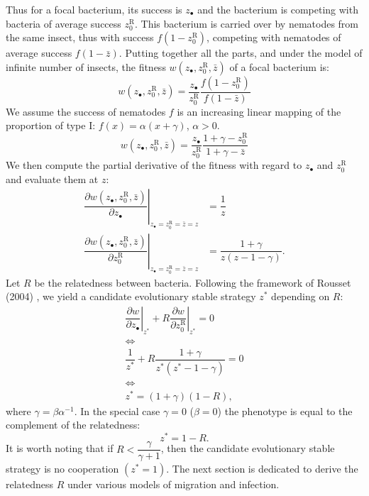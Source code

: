 \documentclass[10pt]{article}
\begin{document}
\begin{multicols}{2}
Thus for a focal bacterium, its success is $z_\bullet$ and the bacterium is competing with bacteria of average success $z_0^{\mathrm{R}}$. 
This bacterium is carried over by nematodes from the same insect, thus with success $f(1- z_0^{\mathrm{R}})$, competing with nematodes of average success $f(1- \bar{z} )$.
  Putting together all the parts, and under the model of infinite number of insects, the fitness $w(z_\bullet ,z_0^{\mathrm{R}} , \bar{z} )$ of a focal bacterium is:
  \begin{equation}
  w(z_\bullet ,z_0^{\mathrm{R}} , \bar{z} ) = \dfrac{z_\bullet}{z_0^{\mathrm{R}}}\dfrac{f(1- z_0^{\mathrm{R}}) }{f(1- \bar{z} )}
  \end{equation}
   We assume the success of nematodes $f$ is an increasing linear mapping of the proportion of type I: $f (x)=\alpha (x+\gamma)$, $\alpha>0$.
  \begin{equation}
  w(z_\bullet ,z_0^{\mathrm{R}} , \bar{z} ) = \dfrac{z_\bullet}{z_0^{\mathrm{R}}}\dfrac{1+\gamma - z_0^{\mathrm{R}}}{ 1+\gamma - \bar{z}}
  \end{equation}
  We then compute the partial derivative of the fitness with regard to $z_\bullet$ and $z_0^{\mathrm{R}}$ and evaluate them at $z$:
  \begin{align}
   \left. \dfrac{\partial w(z_\bullet ,z_0^{\mathrm{R}} , \bar{z} )}{\partial z_\bullet} \right\vert_{z_\bullet = z_0^{\mathrm{R}} = \bar{z}=z} &= \dfrac{1}{ z } \\
   \left. \dfrac{\partial w(z_\bullet ,z_0^{\mathrm{R}} , \bar{z} )}{\partial z_0^{\mathrm{R}}} \right\vert_{z_\bullet = z_0^{\mathrm{R}} = \bar{z}=z} &= \dfrac{1+\gamma}{z(z -1 - \gamma)}.
  \end{align}
  Let $R$ be the relatedness between bacteria. Following the framework of Rousset (2004) \cite{rousset2004genetic}, we yield a candidate evolutionary stable strategy $z^*$ depending on $R$:
    \begin{gather}
    \left. \dfrac{\partial w}{\partial z_\bullet} \right\vert_{z^*} +  R \left. \dfrac{\partial w}{\partial z_0^{\mathrm{R}}} \right\vert_{z^*} =0 \\
      \iff \nonumber \\
  \dfrac{1}{ z^* } + R \dfrac{1+\gamma}{z^*(z^* -1 - \gamma)} =0 \\
    \iff \nonumber \\
  z^*=(1+ \gamma)(1-R),
  \end{gather}
  where $\gamma=\beta \alpha^{-1}$. In the special case $\gamma=0$ ($\beta=0$) the phenotype is equal to the complement of the relatedness:
  \begin{equation}
  z^*=1-R.
  \end{equation} 
  It is worth noting that if $R<\dfrac{\gamma}{\gamma+1}$, then the candidate evolutionary stable strategy is no cooperation $(z^*=1)$.
  The next section is dedicated to derive the relatedness $R$ under various models of migration and infection.

\end{multicols}
\end{document}
